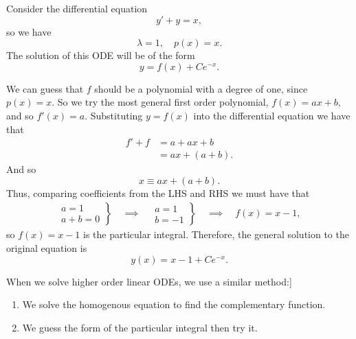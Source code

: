 \begin{example}[$p(x)=x$]
Consider the differential equation
\[y'+y=x,\]
so we have
\[\lambda=1,\quad p(x)=x.\]
The solution of this ODE will be of the form \[y=f(x)+Ce^{-x}.\]

We can guess that $f$ should be a polynomial with a degree of one, since $p(x)=x$. So we try the most general first order polynomial, $f(x)=ax+b$, and so $f'(x)=a$. Substituting $y=f(x)$ into the differential equation we have that
\begin{align*}f'+f&=a+ax+b\\&=ax+(a+b).\end{align*}
And so \[x\equiv ax+(a+b).\]
Thus, comparing coefficients from the LHS and RHS we must have that
\begin{align*}
    \left. \begin{array}{l}
	a=1 \\
	a+b=0
    \end{array}\right\}
    \quad \implies \quad
        \left. \begin{array}{l}
	a=1 \\
	b=-1
    \end{array}\right\} 
    \quad\implies \quad f(x)=x-1,
\end{align*}
so $f(x)=x-1$ is the particular integral. Therefore, the general solution to the original equation is
\[y(x)=x-1+Ce^{-x}.\]
\end{example}

When we solve higher order linear ODEs, we use a similar method:]
\begin{enumerate}
\item We solve the homogenous equation to find the complementary function.
\item We guess the form of the particular integral then try it.
\end{enumerate}
